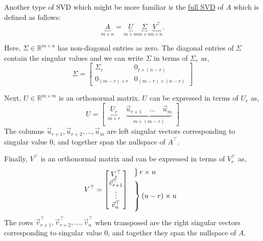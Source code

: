 \documentclass[10pt]{article}
\newcommand{\RR}{\mathbb{R}}
\begin{document}
Another type of SVD which might be more familiar is the \underline{full SVD} of $A$ which is defined as follows:
\[
\underbrace{A}_{m \times n} = \underbrace{U}_{m \times m} \underbrace{\Sigma}_{m \times n} \underbrace{V^\top}_{n \times n}.
\]

Here, $\Sigma \in \RR^{m \times n}$ has non-diagonal entries as zero. The diagonal entries of $\Sigma$ contain the singular values and we can write $\Sigma$ in terms of $\Sigma_r$ as,
\[
\Sigma = \begin{bmatrix} \Sigma_r & 0_{r \times (n-r)} \\ 0_{(m-r) \times r} & 0_{(m-r) \times (n-r)} \end{bmatrix}
\]

Next, $U \in \RR^{m \times m}$ is an orthonormal matrix. $U$ can be expressed in terms of $U_r$ as,
\[
U = \begin{bmatrix} \underbrace{U_r}_{m \times r} & \underbrace{\vec{u}_{r+1} \quad \ldots \quad \vec{u}_m}_{m \times (m-r)} \end{bmatrix}
\]
The columns $\vec{u}_{r+1}, \vec{u}_{r+2}, \ldots, \vec{u}_m$ are left singular vectors corresponding to singular value $0$, and together span the nullspace of $A^\top$.

Finally, $V^\top$ is an orthonormal matrix and can be expressed in terms of $V_r^\top$ as,
\[
V^\top = \begin{bmatrix} V_r^\top \\ \vec{v}_{r+1}^\top \\ \vdots \\ \vec{v}_n^\top \end{bmatrix}
\left.
\begin{array}{l}
\left.\vphantom{\begin{matrix} V_r^\top \end{matrix}}\right\} r \times n \\[6pt]
\left.\vphantom{\begin{matrix} \vec{v}_{r+1}^\top \\ \vdots \\ \vec{v}_n^\top \end{matrix}}\right\} (n-r) \times n
\end{array}
\right.
\]
The rows $\vec{v}_{r+1}^\top, \vec{v}_{r+2}^\top, \ldots, \vec{v}_n^\top$ when transposed are the right singular vectors corresponding to singular value $0$, and together they span the nullspace of $A$.
\end{document}
